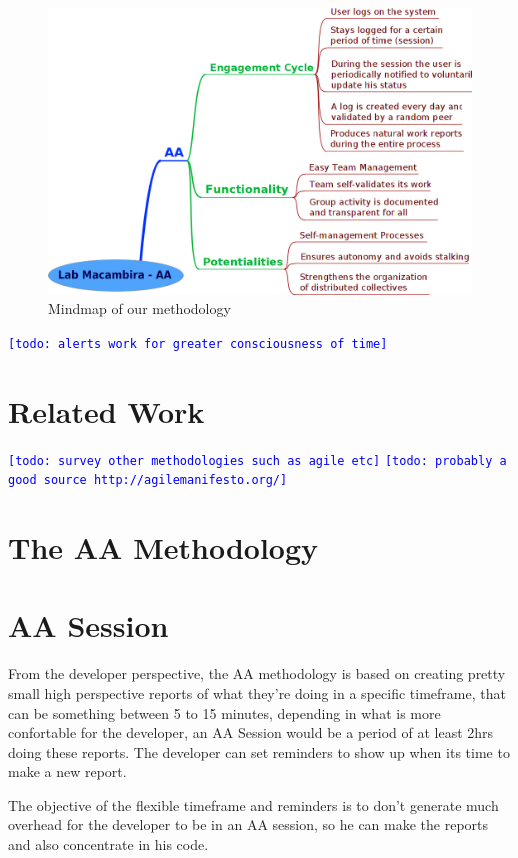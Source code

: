 \documentclass[letterpaper]{article}
\newcommand{\indraftnote}[1]{\textcolor{blue}{\texttt{\footnotesize[#1]}}}
\newcommand{\todo}[1]{\indraftnote{todo: #1}}
\begin{document}
\begin{figure}
\begin{center}
   \includegraphics[width=0.8\linewidth,keepaspectratio=true]{figs/aa-mm.png}
\end{center}
   \caption{
   Mindmap of our methodology
   }
\label{fig:mm}
\end{figure}

\todo{alerts work for greater consciousness of time}

\section{Related Work}
\todo{survey other methodologies such as agile etc}
\todo{probably a good source http://agilemanifesto.org/}

\section{The AA Methodology}

\section{AA Session}

From the developer perspective, the AA methodology is based on creating pretty
small high perspective reports of what they're doing in a specific timeframe,
that can be something between 5 to 15 minutes, depending in what is more
confortable for the developer, an AA Session would be a period of at least 2hrs
doing these reports. The developer can set reminders to show up when its time
to make a new report.

The objective of the flexible timeframe and reminders is to don't generate much
overhead for the developer to be in an AA session, so he can make the reports
and also concentrate in his code.
\end{document}
